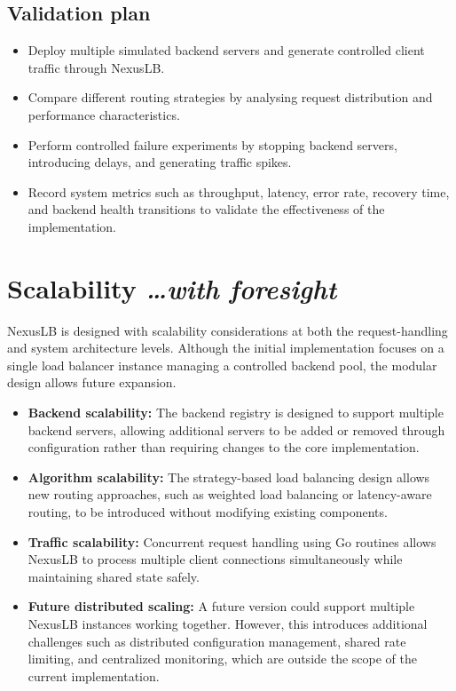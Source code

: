 \documentclass[11pt,a4paper]{article}
\newcommand{\BvrHint}[1]{%
  {\normalfont\normalsize\itshape\hfill #1}}
\begin{document}
\subsection{Validation plan}

\begin{itemize}
    \item Deploy multiple simulated backend servers and generate controlled client traffic through NexusLB.

    \item Compare different routing strategies by analysing request distribution and performance characteristics.

    \item Perform controlled failure experiments by stopping backend servers, introducing delays, and generating traffic spikes.

    \item Record system metrics such as throughput, latency, error rate, recovery time, and backend health transitions to validate the effectiveness of the implementation.
\end{itemize}

\section{Scalability %
\BvrHint{\ldots with foresight}}

NexusLB is designed with scalability considerations at both the request-handling and system architecture levels. Although the initial implementation focuses on a single load balancer instance managing a controlled backend pool, the modular design allows future expansion.

\begin{itemize}
    \item \textbf{Backend scalability:} The backend registry is designed to support multiple backend servers, allowing additional servers to be added or removed through configuration rather than requiring changes to the core implementation.

    \item \textbf{Algorithm scalability:} The strategy-based load balancing design allows new routing approaches, such as weighted load balancing or latency-aware routing, to be introduced without modifying existing components.

    \item \textbf{Traffic scalability:} Concurrent request handling using Go routines allows NexusLB to process multiple client connections simultaneously while maintaining shared state safely.

    \item \textbf{Future distributed scaling:} A future version could support multiple NexusLB instances working together. However, this introduces additional challenges such as distributed configuration management, shared rate limiting, and centralized monitoring, which are outside the scope of the current implementation.
\end{itemize}
\end{document}
